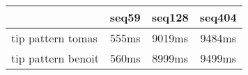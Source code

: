 \begin{tabular}{|l|c|c|c|}
\hline
 & seq59 & seq128 & seq404  \\
\hline
tip pattern tomas &  555ms &  9019ms &  9484ms\\
\hline
tip pattern benoit &  560ms &  8999ms &  9499ms\\
\hline
\end{tabular}
